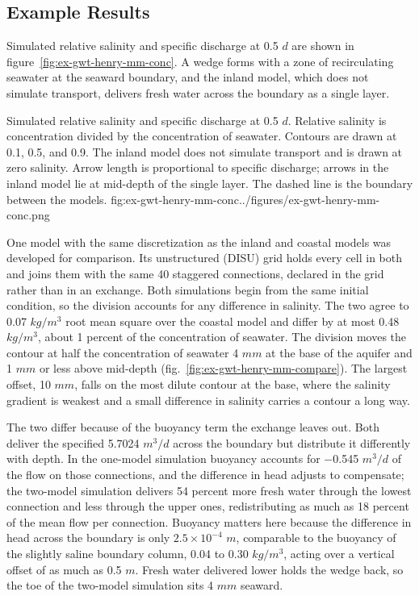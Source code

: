 \subsection{Example Results}

Simulated relative salinity and specific discharge at 0.5 $d$ are shown in figure~\ref{fig:ex-gwt-henry-mm-conc}. A wedge forms with a zone of recirculating seawater at the seaward boundary, and the inland model, which does not simulate transport, delivers fresh water across the boundary as a single layer.

\begin{StandardFigure}{
    Simulated relative salinity and specific discharge at 0.5 $d$. Relative salinity
    is concentration divided by the concentration of seawater. Contours are drawn at
    0.1, 0.5, and 0.9. The inland model does not simulate transport and is drawn at
    zero salinity. Arrow length is proportional to specific discharge; arrows in the
    inland model lie at mid-depth of the single layer. The dashed line is the
    boundary between the models.
    }{fig:ex-gwt-henry-mm-conc}{../figures/ex-gwt-henry-mm-conc.png}
\end{StandardFigure}

One model with the same discretization as the inland and coastal models was developed for comparison. Its unstructured (DISU) grid holds every cell in both and joins them with the same 40 staggered connections, declared in the grid rather than in an exchange. Both simulations begin from the same initial condition, so the division accounts for any difference in salinity. The two agree to 0.07 $kg/m^3$ root mean square over the coastal model and differ by at most 0.48 $kg/m^3$, about 1 percent of the concentration of seawater. The division moves the contour at half the concentration of seawater 4 $mm$ at the base of the aquifer and 1 $mm$ or less above mid-depth (fig.~\ref{fig:ex-gwt-henry-mm-compare}). The largest offset, 10 $mm$, falls on the most dilute contour at the base, where the salinity gradient is weakest and a small difference in salinity carries a contour a long way.

The two differ because of the buoyancy term the exchange leaves out. Both deliver the specified 5.7024 $m^3/d$ across the boundary but distribute it differently with depth. In the one-model simulation buoyancy accounts for \num{-0.545} $m^3/d$ of the flow on those connections, and the difference in head adjusts to compensate; the two-model simulation delivers 54 percent more fresh water through the lowest connection and less through the upper ones, redistributing as much as 18 percent of the mean flow per connection. Buoyancy matters here because the difference in head across the boundary is only $2.5 \times 10^{-4}$ $m$, comparable to the buoyancy of the slightly saline boundary column, 0.04 to 0.30 $kg/m^3$, acting over a vertical offset of as much as 0.5 $m$. Fresh water delivered lower holds the wedge back, so the toe of the two-model simulation sits 4 $mm$ seaward.

